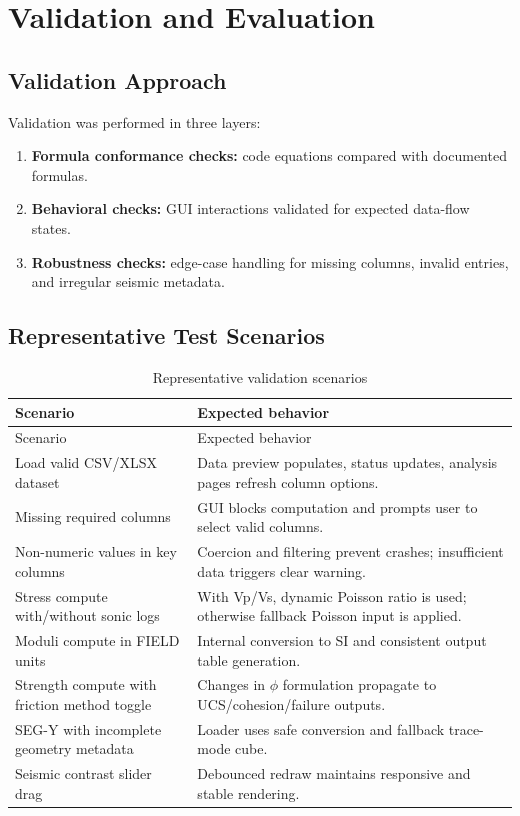 \documentclass[12pt,a4paper]{report}
\begin{document}
\chapter{Validation and Evaluation}
\section{Validation Approach}
Validation was performed in three layers:
\begin{enumerate}
    \item \textbf{Formula conformance checks:} code equations compared with documented formulas.
    \item \textbf{Behavioral checks:} GUI interactions validated for expected data-flow states.
    \item \textbf{Robustness checks:} edge-case handling for missing columns, invalid entries, and irregular seismic metadata.
\end{enumerate}

\section{Representative Test Scenarios}
\begin{longtable}{p{4.5cm}p{9.5cm}}
\caption{Representative validation scenarios}\label{tab:validation} \\
\toprule
Scenario & Expected behavior \\
\midrule
\endfirsthead
\toprule
Scenario & Expected behavior \\
\midrule
\endhead
Load valid CSV/XLSX dataset & Data preview populates, status updates, analysis pages refresh column options. \\
Missing required columns & GUI blocks computation and prompts user to select valid columns. \\
Non-numeric values in key columns & Coercion and filtering prevent crashes; insufficient data triggers clear warning. \\
Stress compute with/without sonic logs & With Vp/Vs, dynamic Poisson ratio is used; otherwise fallback Poisson input is applied. \\
Moduli compute in FIELD units & Internal conversion to SI and consistent output table generation. \\
Strength compute with friction method toggle & Changes in $\phi$ formulation propagate to UCS/cohesion/failure outputs. \\
SEG-Y with incomplete geometry metadata & Loader uses safe conversion and fallback trace-mode cube. \\
Seismic contrast slider drag & Debounced redraw maintains responsive and stable rendering. \\
\bottomrule
\end{longtable}
\end{document}
